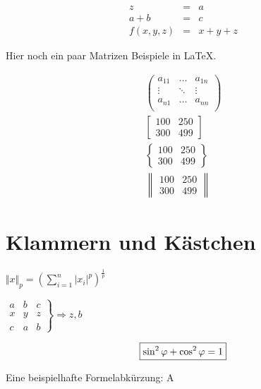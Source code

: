\begin{equation}
	\begin{array}{lcl}
		z & = & a \\
		a + b & = & c \\
		f(x,y,z) & = & x + y + z
	\end{array}
\end{equation}

Hier noch ein paar Matrizen Beispiele in \LaTeX{}.

\begin{align}
	\begin{pmatrix}
		a_{11}	& \dots   & a_{1n}\\
		\vdots	& \ddots  & \vdots\\
		a_{n1}	& \dots   & a_{nn}\\
	\end{pmatrix}
	\\[0.4cm]
	\begin{bmatrix} 
		100&250\\
		300&499
	\end{bmatrix}
	\\[0.4cm]
	\begin{Bmatrix} 
		100&250\\
		300&499
	\end{Bmatrix}
	\\[0.4cm]
	\begin{Vmatrix}
		100&250\\
		300&499
	\end{Vmatrix}
\end{align}

\section{Klammern und Kästchen}

\begin{center}
	\( \Vert x\Vert_{p}=
	\left(
	\sum_{i=1}^{n} | x_{i} |^{p}
	\right)^{\frac{1}{p}} \)
\end{center}

\begin{center}
	\( \left.
	\begin{array}{lc|r}
		a&b&c\\
		\hline
		x&y&z\\
		c&a&b
	\end{array}
	\right\}
	\Rightarrow z,b \)
\end{center}

\begin{equation*}
\mbox{
	\boxed{
		\sin^2\varphi+\cos^2\varphi=1
	}
}
\end{equation*}


Eine beispielhafte Formelabkürzung: 
\ac{A}

